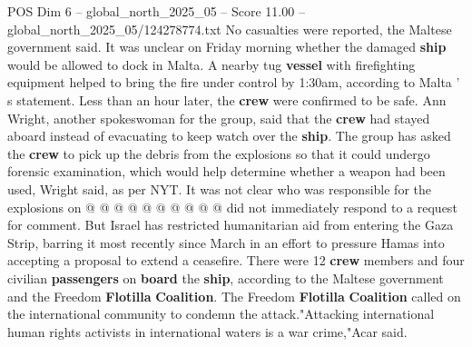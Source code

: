 \begin{textsample}{POS Dim 6 – global\_north\_2025\_05 – Score 11.00 – global\_north\_2025\_05/124278774.txt}
No casualties were reported, the Maltese government said.
It was unclear on Friday morning whether the damaged \textbf{ship} would be allowed to dock in Malta.
A nearby tug \textbf{vessel} with firefighting equipment helped to bring the fire under control by 1:30am, according to Malta ' s statement.
Less than an hour later, the \textbf{crew} were confirmed to be safe.
Ann Wright, another spokeswoman for the group, said that the \textbf{crew} had stayed aboard instead of evacuating to keep watch over the \textbf{ship}.
The group has asked the \textbf{crew} to pick up the debris from the explosions so that it could undergo forensic examination, which would help determine whether a weapon had been used, Wright said, as per NYT.
It was not clear who was responsible for the explosions on @ @ @ @ @ @ @ @ @ @ did not immediately respond to a request for comment.
But Israel has restricted humanitarian aid from entering the Gaza Strip, barring it most recently since March in an effort to pressure Hamas into accepting a proposal to extend a ceasefire.
There were 12 \textbf{crew} members and four civilian \textbf{passengers} on \textbf{board} the \textbf{ship}, according to the Maltese government and the Freedom \textbf{Flotilla} \textbf{Coalition}.
The Freedom \textbf{Flotilla} \textbf{Coalition} called on the international community to condemn the attack."Attacking international human rights activists in international waters is a war crime,"Acar said.

\end{textsample}
